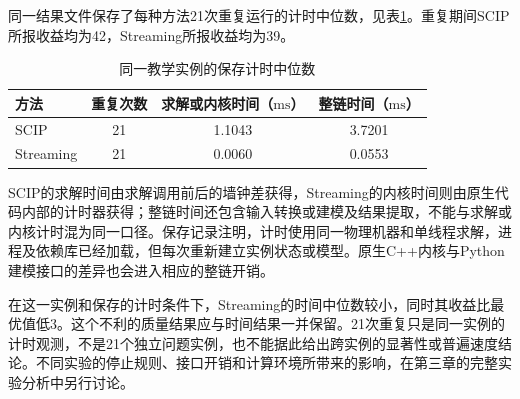 同一结果文件保存了每种方法21次重复运行的计时中位数，见表\ref{s0207:saved_timing}。重复期间SCIP所报收益均为42，Streaming所报收益均为39。

\begin{table}[htbp]
 \centering
 \caption{同一教学实例的保存计时中位数}
 \label{s0207:saved_timing}
 \begin{tabular}{lccc}
  \toprule
  方法 & 重复次数 & 求解或内核时间（$\mathrm{ms}$） & 整链时间（$\mathrm{ms}$） \\
  \midrule
  SCIP & 21 & 1.1043 & 3.7201 \\
  Streaming & 21 & 0.0060 & 0.0553 \\
  \bottomrule
 \end{tabular}
\end{table}

SCIP的求解时间由求解调用前后的墙钟差获得，Streaming的内核时间则由原生代码内部的计时器获得；整链时间还包含输入转换或建模及结果提取，不能与求解或内核计时混为同一口径。保存记录注明，计时使用同一物理机器和单线程求解，进程及依赖库已经加载，但每次重新建立实例状态或模型。原生C++内核与Python建模接口的差异也会进入相应的整链开销。

在这一实例和保存的计时条件下，Streaming的时间中位数较小，同时其收益比最优值低3。这个不利的质量结果应与时间结果一并保留。21次重复只是同一实例的计时观测，不是21个独立问题实例，也不能据此给出跨实例的显著性或普遍速度结论。不同实验的停止规则、接口开销和计算环境所带来的影响，在第三章的完整实验分析中另行讨论。
